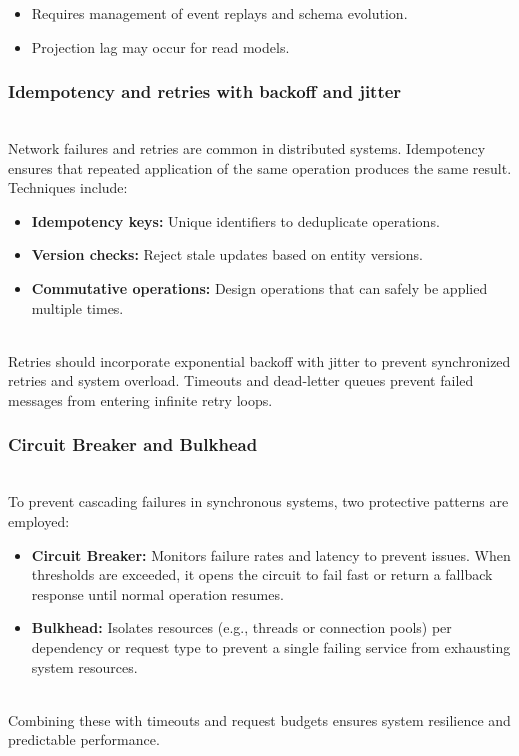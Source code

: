 \begin{itemize}
\item
\protect{}\label{YY8wnt8pR0Ak-BFLavlVH}
Requires management of event replays and schema evolution.
\item
\protect{}\label{_23r-3y9R28dOhS9jBmpa}
Projection lag may occur for read models.
\end{itemize}

\subsubsection{Idempotency and retries with backoff and jitter}\label{2BSgLjBCqjRXUk3AA1-ZT}
\\
Network failures and retries are common in distributed systems. Idempotency ensures that repeated application of the same operation produces the same result. Techniques include:

\begin{itemize}
\item
\protect{}\label{KXU7kVWZqaj4RZoeM27zL}
\textbf{Idempotency keys:} Unique identifiers to deduplicate operations.
\item
\protect{}\label{Wtxyp5-cC1PAIMFjT0Q9n}
\textbf{Version checks:} Reject stale updates based on entity versions.
\item
\protect{}\label{a3MtJRL-IoqC8u1XCWOBG}
\textbf{Commutative operations:} Design operations that can safely be applied multiple times.
\end{itemize}
\\
Retries should incorporate exponential backoff with jitter to prevent synchronized retries and system overload. Timeouts and dead-letter queues prevent failed messages from entering infinite retry loops.

\subsubsection{Circuit Breaker and Bulkhead}\label{JB-N8D1F6QlQckP09mF3k}
\\
To prevent cascading failures in synchronous systems, two protective patterns are employed:

\begin{itemize}
\item
\protect{}\label{RfbHZiLoftOXF4oTT6siq}
\textbf{Circuit Breaker:} Monitors failure rates and latency to prevent issues. When thresholds are exceeded, it opens the circuit to fail fast or return a fallback response until normal operation resumes.
\item
\protect{}\label{TOLnV11A9NoBina2J4bhv}
\textbf{Bulkhead:} Isolates resources (e.g., threads or connection pools) per dependency or request type to prevent a single failing service from exhausting system resources.
\end{itemize}
\\
Combining these with timeouts and request budgets ensures system resilience and predictable performance.

